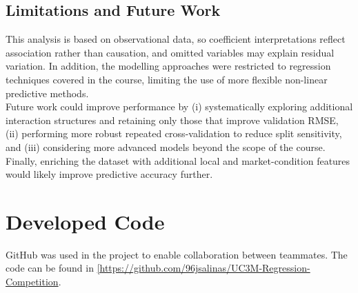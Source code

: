\documentclass[12pt,oneside]{article} %
\begin{document}
\subsection{Limitations and Future Work}

This analysis is based on observational data, so coefficient interpretations reflect association rather than causation, and omitted variables may explain residual variation. In addition, the modelling approaches were restricted to regression techniques covered in the course, limiting the use of more flexible non-linear predictive methods.\\

\noindent
Future work could improve performance by (i) systematically exploring additional interaction structures and retaining only those that improve validation RMSE, (ii) performing more robust repeated cross-validation to reduce split sensitivity, and (iii) considering more advanced models beyond the scope of the course. Finally, enriching the dataset with additional local and market-condition features would likely improve predictive accuracy further.


\section{Developed Code}
GitHub was used in the project to enable collaboration between teammates. The code can be found in \url{[https://github.com/96jsalinas/UC3M-Regression-Competition}.
\end{document}
